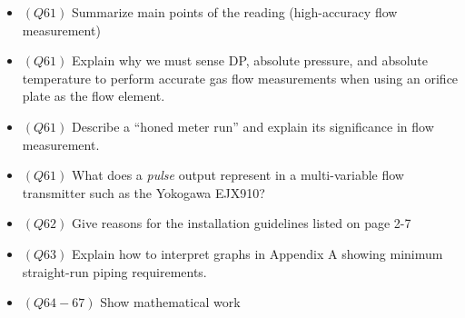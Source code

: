 \begin{itemize}
\begin{itemize}
\begin{itemize}
\item{$(Q61)$} Summarize main points of the reading (high-accuracy flow measurement)
\item{$(Q61)$} Explain why we must sense DP, absolute pressure, and absolute temperature to perform accurate gas flow measurements when using an orifice plate as the flow element.
\item{$(Q61)$} Describe a ``honed meter run'' and explain its significance in flow measurement.
\item{$(Q61)$} What does a {\it pulse} output represent in a multi-variable flow transmitter such as the Yokogawa EJX910?
\item{$(Q62)$} Give reasons for the installation guidelines listed on page 2-7
\item{$(Q63)$} Explain how to interpret graphs in Appendix A showing minimum straight-run piping requirements.
\item{$(Q64-67)$} Show mathematical work
\medskip


\end{itemize}
\end{itemize}
\end{itemize}
